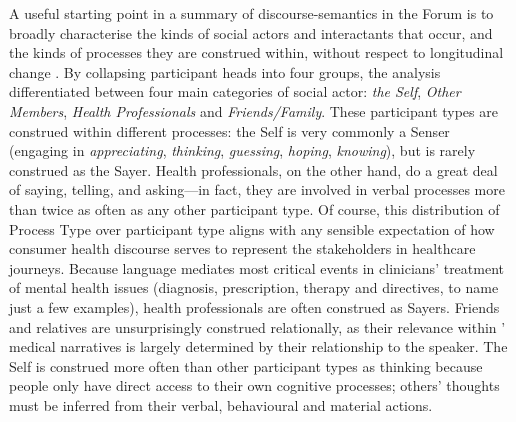 A useful starting point in a summary of \glspl{discourse-semantic} in the \gls{Forum} is to broadly characterise the kinds of social actors and interactants that occur, and the kinds of processes they are construed within, without respect to longitudinal change \cite{van_leeuwen_representation_1996}. By collapsing participant heads into four groups, the  analysis differentiated between four main categories of social actor: \emph{the Self}, \emph{Other Members}, \emph{Health Professionals} and \emph{Friends\slash Family}. These participant types are construed within different processes: the Self is very commonly a Senser (engaging in \emph{appreciating}, \emph{thinking}, \emph{guessing}, \emph{hoping}, \emph{knowing}), but is rarely construed as the Sayer. Health professionals, on the other hand, do a great deal of saying, telling, and asking---in fact, they are involved in verbal processes more than twice as often as any other participant type. Of course, this distribution of Process Type over participant type aligns with any sensible expectation of how \gls{consumer} health discourse serves to represent the stakeholders in healthcare journeys. Because language mediates most critical events in clinicians' treatment of mental health issues (diagnosis, prescription, therapy and directives, to name just a few examples), health professionals are often construed as Sayers. Friends and relatives are unsurprisingly construed relationally, as their relevance within ' medical narratives is largely determined by their relationship to the speaker. The Self is construed more often than other participant types as thinking because people only have direct access to their own cognitive processes; others' thoughts must be inferred from their verbal, behavioural and material actions.

